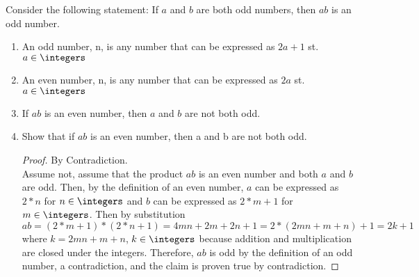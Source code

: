 \documentclass{article}
\begin{document}
\nextprob
Consider the following statement: If $a$ and $b$ are both odd numbers, then $ab$ is
an odd number.
\begin{enumerate}
\item An odd number, n, is any number that can be expressed as $2a + 1$ st. $a \in \integers$
\item An even number, n, is any number that can be expressed as $2a$ st. $a \in \integers$
\item If $ab$ is an even number, then $a$ and $b$ are not both odd.
\item Show that if $ab$ is an even number, then a and b are not both odd.

\begin{proof} By Contradiction. \\
Assume not, assume that the product $ab$ is an even number and both $a$ and $b$ are odd.
Then, by the definition of an even number, $a$ can be expressed as $2*n$ for $n \in \integers$ and $b$ can be expressed as $2*m + 1$ for $m \in \integers$.
Then by substitution $ab = (2*m + 1) * (2*n + 1) = 4mn + 2m + 2n + 1 = 2 *(2mn + m + n) + 1 = 2k + 1$ where $k = 2mn + m + n$,
$k \in \integers$ because addition and multiplication are closed under the integers.
Therefore, $ab$ is odd by the definition of an odd number, a contradiction, and the claim is proven true by contradiction.
\end{proof}

\end{enumerate}
\end{document}
